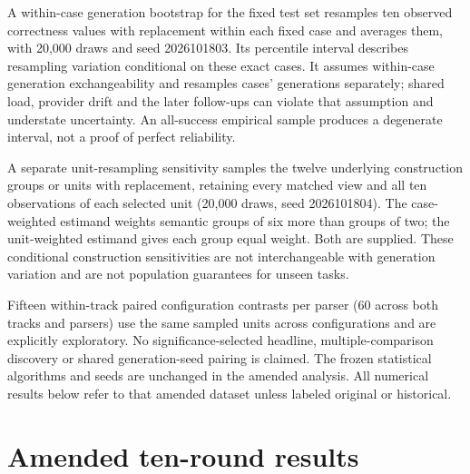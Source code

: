 \documentclass[a4paper,preprint,12pt,numbers,nopreprintline]{elsarticle}
\begin{document}
A within-case generation bootstrap for the fixed test set resamples ten observed correctness values with replacement within each fixed case and averages them, with 20,000 draws and seed 2026101803. Its percentile interval describes resampling variation conditional on these exact cases. It assumes within-case generation exchangeability and resamples cases' generations separately; shared load, provider drift and the later follow-ups can violate that assumption and understate uncertainty. An all-success empirical sample produces a degenerate interval, not a proof of perfect reliability.

A separate unit-resampling sensitivity samples the twelve underlying construction groups or units with replacement, retaining every matched view and all ten observations of each selected unit (20,000 draws, seed 2026101804). The case-weighted estimand weights semantic groups of six more than groups of two; the unit-weighted estimand gives each group equal weight. Both are supplied. These conditional construction sensitivities are not interchangeable with generation variation and are not population guarantees for unseen tasks.

Fifteen within-track paired configuration contrasts per parser (60 across both tracks and parsers) use the same sampled units across configurations and are explicitly exploratory. No significance-selected headline, multiple-comparison discovery or shared generation-seed pairing is claimed. The frozen statistical algorithms and seeds are unchanged in the amended analysis. All numerical results below refer to that amended dataset unless labeled original or historical.

\section{Amended ten-round results}\label{sec:challenge-full-results}
\end{document}
